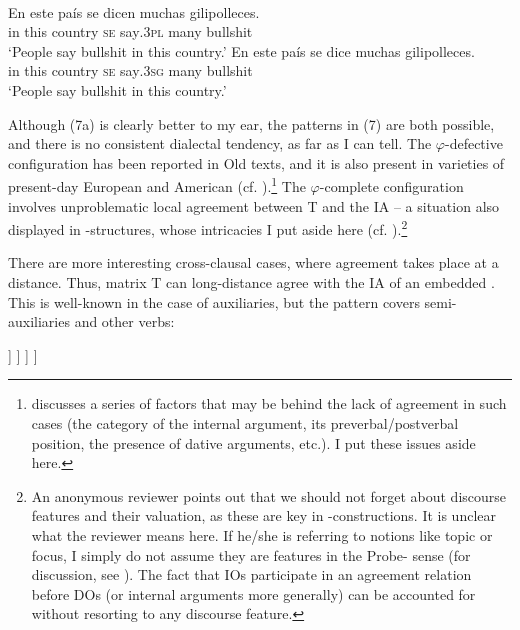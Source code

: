 \documentclass[output=paper]{langsci/langscibook}
\begin{document}
\ea%
    \label{ex:gallego:7}\\
    \ea
    \gll En  este  país        se   dicen       muchas  gilipolleces.       \\
         in   this   country  \textsc{se}  say\textsc{{}.3pl}  many     bullshit\\
    \glt ‘People say bullshit in this country.’
    \ex
    \gll En  este  país        se   dice        muchas  gilipolleces.       \\
         in   this   country  \textsc{se} say\textsc{{}.3sg}  many     bullshit \\
    \glt ‘People say bullshit in this country.’
    \z
\z\largerpage[-2]

Although (7a) is clearly better to my ear, the patterns in (7) are both possible, and there is no consistent dialectal tendency, as far as I can tell. The $\varphi $-defective configuration has been reported in Old  texts, and it is also present in varieties of present-day European and American  (cf. \citealt{Mendikoetxea1999}).\footnote{\citet{RAE-ASALE2009} discusses a series of factors that may be behind the lack of agreement in such cases (the category of the internal argument, its preverbal\slash postverbal position, the presence of dative arguments, etc.). I put these issues aside here.} The $\varphi $-complete configuration involves unproblematic local agreement between T and the IA – a situation also displayed in \DAT-\NOM structures, whose intricacies I put aside here (cf. \citealt{López2007,Chomsky2008}).\footnote{An anonymous reviewer points out that we should not forget about discourse features and their valuation, as these are key in \DAT-\NOM constructions. It is unclear what the reviewer means here. If he\slash she is referring to notions like topic or focus, I simply do not assume they are features in the Probe- sense (for discussion, see \citealt{Chomsky2001Derivation,Chomsky2008,Chomsky2017,Ott2016}). The fact that IOs participate in an agreement relation before DOs (or internal arguments more generally)  can be accounted for without resorting to any discourse feature.} 

There are more interesting cross-clausal cases, where agreement takes place at a distance. Thus, matrix T can long-distance agree with the IA of an embedded . This is well-known in the case of auxiliaries, but the pattern covers semi-auxiliaries and other verbs: 

\ea%
\settowidth\jamwidth{[\textsc{semiaux} = try, need, etc.]}
    \label{ex:gallego:8}
    \ea\relax [ T [ SE  V\textsubscript{AUX}         [ INF XP ] ] ]      \jambox{[\textsc{aux} = can, should, etc.]}
    \ex\relax [ T [ SE  V\textsubscript{SEMIAUX}  [ INF XP ] ] ]         \jambox{[\textsc{semiaux} = try, need, etc.]}
    \z
\z\largerpage[-2]
\end{document}
